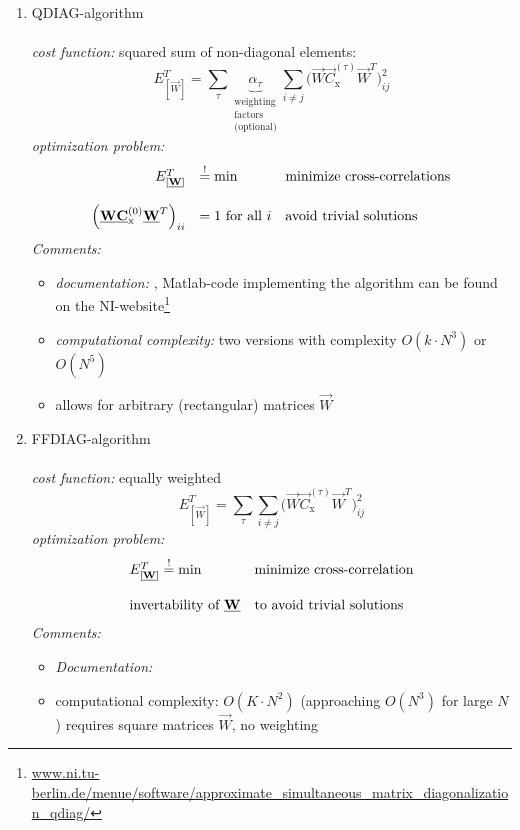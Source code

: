 \begin{enumerate}[(1)]
\item QDIAG-algorithm
\\\\
\emph{cost function:} squared sum of non-diagonal elements:
\begin{equation}
	E_{[\vec{W}]}^T = \sum\limits_{\tau} \underbrace{ \alpha_\tau }_{
		\substack{ 	\text{weighting} \\ 
				\text{factors} \\
				\text{(optional)}} }
		\sum\limits_{i \neq j} \Big( \vec{W} \vec{C}_{\mathrm{x}}^{(\tau)} \vec{W}^T \Big)_{ij}^2
\end{equation}
\emph{optimization problem:}
\begin{equation}
	\begin{array}{rll}
		E_{[\underline{\mathbf{W}}]}^T & \stackrel{\mathrm{!}}{=} \min 
		& \text{minimize cross-correlations} \\\\
		\Big( \underline{\mathbf{W}} \underline{\mathbf{C}}_{\mathrm{x}}^{(0)} \underline{\mathbf{W}}^T \Big)_{ii}
			& = 1 \text{ for all } i
		& \text{avoid trivial solutions}
	\end{array}
\end{equation}
\emph{Comments:}
\begin{itemize}
\item \emph{documentation:} \textcite{VollgrafObermayer2006}, Matlab-code implementing the algorithm can be found on the NI-website\footnote{\url{www.ni.tu-berlin.de/menue/software/approximate_simultaneous_matrix_diagonalization_qdiag/}}
\item \emph{computational complexity:} two versions with complexity
	$O (k \cdot N^3)$ or $O (N^5)$
\item allows for arbitrary (rectangular) matrices $\vec{W}$
\end{itemize}

\item  FFDIAG-algorithm
\\\\
\emph{cost function:} equally weighted
\begin{equation}
	E_{[\vec{W}]}^T = \sum\limits_\tau \sum\limits_{i \neq j}
	\big( \vec{W} \vec{C}_{\mathrm{x}}^{(\tau)} \vec{W}^T \big)_{ij}^2
\end{equation}
\emph{optimization problem:}
\begin{equation}
	\begin{array}{ll}
		E_{[\underline{\mathbf{W}}]}^T \stackrel{\mathrm{!}}{=} \min 
		& \text{minimize cross-correlation} \\\\
		\text{invertability of } \underline{\mathbf{W}}
		& \text{to avoid trivial solutions}
	\end{array}
\end{equation}
\emph{Comments:}
\begin{itemize}
\item \emph{Documentation:} \textcite{ZieheEtAl2004} 
  \item computational complexity: $O (K \cdot N^2)$ (approaching $O (N^3)$ for large $N$) 
 requires square matrices $\vec{W}$, no weighting
\end{itemize}
\end{enumerate}
